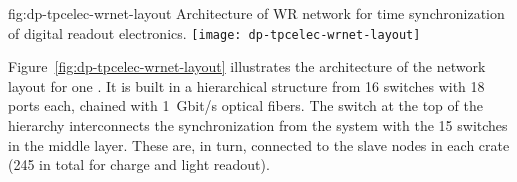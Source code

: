 \begin{dunefigure}{fig:dp-tpcelec-wrnet-layout}
{Architecture of WR network for time synchronization of digital readout electronics.}
\texttt{[image: dp-tpcelec-wrnet-layout]}
\end{dunefigure}

Figure~\ref{fig:dp-tpcelec-wrnet-layout} illustrates the architecture of the  network layout for one . It is built in a hierarchical structure from \num{16}  switches with \num{18} ports each, chained with \SI{1}{Gbit/s} optical fibers. The switch at the top of the hierarchy interconnects the synchronization  from the  system with the \num{15} switches in the middle layer. These are, in turn, connected to the  slave nodes in each  crate (\num{245} in total for charge and light readout). 
